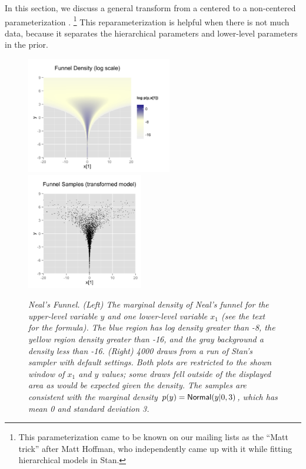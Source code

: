 In this section, we discuss a general transform from a centered to a
non-centered parameterization \cite{papa-et-al:2007}.%
%
\footnote{This parameterization came to be known on our mailing lists
  as the ``Matt trick'' after Matt Hoffman, who independently came up
  with it while fitting hierarchical models in Stan.}
%
This reparameterization is helpful when there is not much data,
because it separates the hierarchical parameters and lower-level
parameters in the prior.
%
\begin{figure}[t]
\vspace*{-6pt}
\begin{center}
\includegraphics[height=2in]{img/funnel.png}
\includegraphics[height=2in]{img/funnel-fit.png}
\end{center}
\vspace*{-18pt}
\caption{\small\it Neal's Funnel.  (Left) The marginal density of
  Neal's funnel for the upper-level variable $y$ and one lower-level
  variable $x_1$ (see the text for the formula).  The blue region has
  log density greater than -8, the yellow region density greater than
  -16, and the gray background a density less than -16.  
  (Right) 4000 draws from a run of Stan's
  sampler with default settings.  Both plots are restricted to the
  shown window of $x_1$ and $y$ values; some draws fell outside of
  the displayed area as would be expected given the density.  The samples are
  consistent with the marginal density $p(y) =
  \distro{Normal}(y|0,3)$, which has mean 0 and standard deviation
  3.}\label{funnel.figure}
\end{figure}

